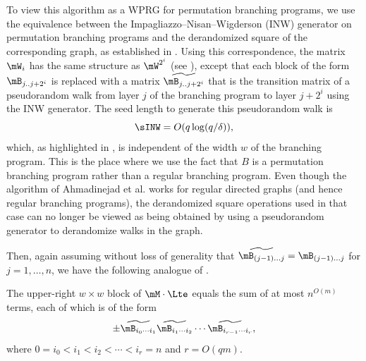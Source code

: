 \documentclass{toc}
\begin{document}
    To view this algorithm as a WPRG for permutation branching programs, we use
    the equivalence between the Impagliazzo--Nisan--Wigderson (INW) generator on permutation branching programs and the derandomized square of the corresponding graph, as established in \cite{RozenmanVa05,HozaPyVa21}.
    Using this correspondence, the matrix $\mW_i$ has the same structure as $\mW^{2^i}$ (see ), except that each block of the form $\mB_{j..j+2^i}$ is replaced with a matrix $\widetilde{\mB_{j..j+2^i}}$ that is the transition matrix of a pseudorandom
    walk from layer $j$ of the branching program to layer $j+2^i$ using the INW generator.  
    The seed length to generate this pseudorandom walk is
    $$\sINW = O(q\log(q/\delta)),$$
    which, as highlighted in \cite{HozaPyVa21}, is independent of the width $w$ of the branching program.
    This is the place where we use the fact that $B$ is a permutation branching program rather than a regular branching program.  Even though the algorithm of Ahmadinejad et al. works for regular directed graphs (and hence regular branching programs), the derandomized square operations used in that case can no longer be viewed as being obtained by using a pseudorandom generator to derandomize walks in the graph.
    
    Then, again assuming without loss of generality that 
    $\widetilde{\mB_{(j-1)\ldots j}}=\mB_{(j-1)\ldots j}$ for $j=1,\ldots,n$, we have
    the following analogue of . %
    \begin{observation} \label{obs:cycle}
    The upper-right $w\times w$ block of $\mM \cdot \Lte$ equals the sum of at most $n^{O(m)}$ terms, each of which is of the form 
    \begin{equation} \label{eqn:permutation-terms}
    \pm \widetilde{\mB_{i_0\cdots i_1}}
    \widetilde{\mB_{i_1\cdots i_2}}
    \cdots
    \widetilde{\mB_{i_{r-1}\cdots i_r}},
    \end{equation}
    where $0=i_0<i_1<i_2<\cdots<i_r=n$ and $r=O(qm)$.
    \end{observation}
    
\end{document}
